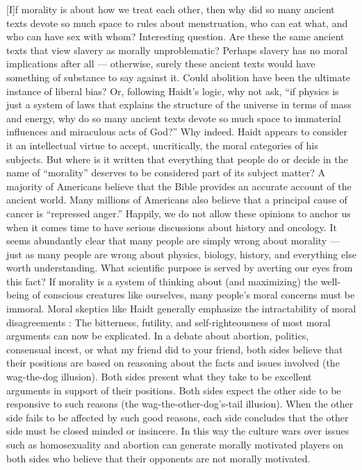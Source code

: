 \documentclass[a4paper,14pt]{extbook}
\begin{document}
[I]f morality is about how we treat each other, then why did so many ancient texts devote so much space to rules about menstruation, who can eat what, and who can have sex with whom?
Interesting question.
Are these the same ancient texts that view slavery as morally unproblematic?
Perhaps slavery has no moral implications after all --- otherwise, surely these ancient texts would have something of substance to say against it.
Could abolition have been the ultimate instance of liberal bias?
Or, following Haidt's logic, why not ask, ``if physics is just a system of laws that explains the structure of the universe in terms of mass and energy, why do so many ancient texts devote so much space to immaterial influences and miraculous acts of God?''
Why indeed.
Haidt appears to consider it an intellectual virtue to accept, uncritically, the moral categories of his subjects.
But where is it written that everything that people do or decide in the name of ``morality'' deserves to be considered part of its subject matter?
A majority of Americans believe that the Bible provides an accurate account of the ancient world.
Many millions of Americans also believe that a principal cause of cancer is ``repressed anger.''
Happily, we do not allow these opinions to anchor us when it comes time to have serious discussions about history and oncology.
It seems abundantly clear that many people are simply wrong about morality --- just as many people are wrong about physics, biology, history, and everything else worth understanding.
What scientific purpose is served by averting our eyes from this fact?
If morality is a system of thinking about (and maximizing) the well-being of conscious creatures like ourselves, many people's moral concerns must be immoral.
Moral skeptics like Haidt generally emphasize the intractability of moral disagreements :
The bitterness, futility, and self-righteousness of most moral arguments can now be explicated.
In a debate about abortion, politics, consensual incest, or what my friend did to your friend, both sides believe that their positions are based on reasoning about the facts and issues involved (the wag-the-dog illusion).
Both sides present what they take to be excellent arguments in support of their positions.
Both sides expect the other side to be responsive to such reasons (the wag-the-other-dog's-tail illusion).
When the other side fails to be affected by such good reasons, each side concludes that the other side must be closed minded or insincere.
In this way the culture wars over issues such as homosexuality and abortion can generate morally motivated players on both sides who believe that their opponents are not morally motivated.
\end{document}
